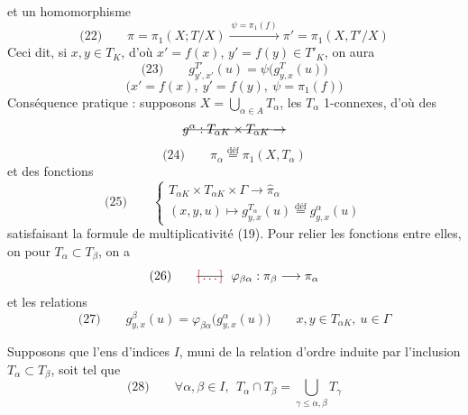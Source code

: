 \documentclass[11pt,a4paper]{article}
\begin{document}
et un homomorphisme
\[
\text{(22)}\qquad \pi = \pi_1(X;T/X) \xrightarrow{\ \psi = \pi_1(f)\ } \pi' = \pi_1(X,T'/X)
\]
Ceci dit, si $x, y \in T_K$, d'où $x' = f(x)$, $y' = f(y) \in T'_K$, on aura
\[
\text{(23)}\qquad g^{T'}_{y',x'}(u) = \psi\bigl(g^{T}_{y,x}(u)\bigr)
\]
\[
\bigl(x' = f(x),\ y' = f(y),\ \psi = \pi_1(f)\bigr)
\]
Conséquence pratique : supposons $X = \bigcup_{\alpha \in A} T_\alpha$, les $T_\alpha$ 1-connexes, d'où des  
\[
\text{\struck{$g^{\alpha} : T_{\alpha K} \times T_{\alpha K} \to$}}
\]
\[
\text{(24)}\qquad \pi_\alpha \overset{\text{déf}}{=} \pi_1(X, T_\alpha)
\]
et des fonctions
\[
\text{(25)}\qquad
\left\{
\begin{array}{l}
T_{\alpha K} \times T_{\alpha K} \times \Gamma \longrightarrow \widehat{\pi}_\alpha \\
(x,y,u) \longmapsto g^{T_\alpha}_{y,x}(u) \overset{\text{déf}}{=} g^{\alpha}_{y,x}(u)
\end{array}
\right.
\]
satisfaisant la formule de multiplicativité (19). Pour relier les fonctions entre elles,  on   \struck{\ill{}} pour $T_\alpha \subset T_\beta$, on a
\[
\text{(26)}\qquad \text{\struck{$\ill{}$}}\ \ \varphi_{\beta\alpha} : \pi_\beta \longrightarrow \pi_\alpha
\]
et les relations
\[
\text{(27)}\qquad g^{\beta}_{y,x}(u) = \varphi_{\beta\alpha}\bigl(g^{\alpha}_{y,x}(u)\bigr) \qquad x, y \in T_{\alpha K},\ u \in \Gamma
\]

Supposons que l'ens d'indices $I$, muni de la relation d'ordre induite par l'inclusion $T_\alpha \subset T_\beta$, soit tel que 
\[
\text{(28)}\qquad \forall \alpha, \beta \in I,\ \ T_\alpha \cap T_\beta = \bigcup_{\gamma \leq \alpha,\beta} T_\gamma
\]
\end{document}
